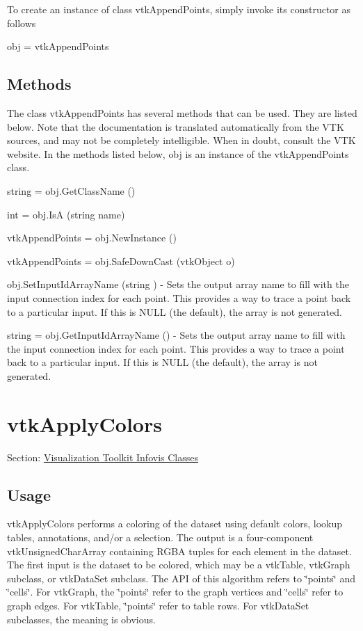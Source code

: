 To create an instance of class vtk\-Append\-Points, simply invoke its constructor as follows \begin{DoxyVerb}  obj = vtkAppendPoints
\end{DoxyVerb}
 \hypertarget{vtkwidgets_vtkxyplotwidget_Methods}{}\subsection{Methods}\label{vtkwidgets_vtkxyplotwidget_Methods}
The class vtk\-Append\-Points has several methods that can be used. They are listed below. Note that the documentation is translated automatically from the V\-T\-K sources, and may not be completely intelligible. When in doubt, consult the V\-T\-K website. In the methods listed below, {\ttfamily obj} is an instance of the vtk\-Append\-Points class. 
\begin{DoxyItemize}
\item {\ttfamily string = obj.\-Get\-Class\-Name ()}  
\item {\ttfamily int = obj.\-Is\-A (string name)}  
\item {\ttfamily vtk\-Append\-Points = obj.\-New\-Instance ()}  
\item {\ttfamily vtk\-Append\-Points = obj.\-Safe\-Down\-Cast (vtk\-Object o)}  
\item {\ttfamily obj.\-Set\-Input\-Id\-Array\-Name (string )} -\/ Sets the output array name to fill with the input connection index for each point. This provides a way to trace a point back to a particular input. If this is N\-U\-L\-L (the default), the array is not generated.  
\item {\ttfamily string = obj.\-Get\-Input\-Id\-Array\-Name ()} -\/ Sets the output array name to fill with the input connection index for each point. This provides a way to trace a point back to a particular input. If this is N\-U\-L\-L (the default), the array is not generated.  
\end{DoxyItemize}\hypertarget{vtkinfovis_vtkapplycolors}{}\section{vtk\-Apply\-Colors}\label{vtkinfovis_vtkapplycolors}
Section\-: \hyperlink{sec_vtkinfovis}{Visualization Toolkit Infovis Classes} \hypertarget{vtkwidgets_vtkxyplotwidget_Usage}{}\subsection{Usage}\label{vtkwidgets_vtkxyplotwidget_Usage}
vtk\-Apply\-Colors performs a coloring of the dataset using default colors, lookup tables, annotations, and/or a selection. The output is a four-\/component vtk\-Unsigned\-Char\-Array containing R\-G\-B\-A tuples for each element in the dataset. The first input is the dataset to be colored, which may be a vtk\-Table, vtk\-Graph subclass, or vtk\-Data\-Set subclass. The A\-P\-I of this algorithm refers to \char`\"{}points\char`\"{} and \char`\"{}cells\char`\"{}. For vtk\-Graph, the \char`\"{}points\char`\"{} refer to the graph vertices and \char`\"{}cells\char`\"{} refer to graph edges. For vtk\-Table, \char`\"{}points\char`\"{} refer to table rows. For vtk\-Data\-Set subclasses, the meaning is obvious.

